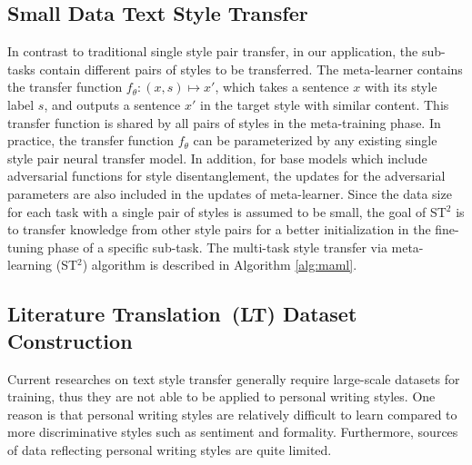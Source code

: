 \subsection{Small Data Text Style Transfer}
\label{sec:st2}
In contrast to traditional single style pair transfer, in our application, the sub-tasks contain different pairs of styles to be transferred. The meta-learner contains the transfer function 
$f_{\theta}: (x, s)\mapsto x'$, which takes a sentence $x$ with its 
style label $s$, and outputs a sentence $x'$ in the target style with 
similar content. This transfer function is shared by all pairs of styles 
in the meta-training phase. In practice, the transfer function $f_\theta$ can be parameterized by any existing single style pair neural transfer model. In addition, for base models which include adversarial functions for style disentanglement, the updates for the adversarial parameters are also included in the updates of meta-learner. Since the data size for each task with a 
single pair of styles is assumed to be small, 
the goal of ST$^2$ is to transfer knowledge from other style pairs for a better initialization in the fine-tuning phase of a specific sub-task. 
The multi-task style transfer via meta-learning (ST$^2$) algorithm is 
described in Algorithm \ref{alg:maml}. 

\subsection{Literature Translation~(LT) Dataset Construction}
\label{sec:lt}
Current researches on text style transfer generally require large-scale datasets for training, thus they are not able to be applied to personal writing styles. One reason is that personal writing styles are relatively difficult to learn compared to more discriminative styles such as sentiment and formality. Furthermore, sources of data reflecting personal writing styles are quite limited. 

